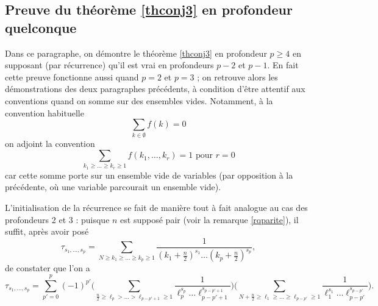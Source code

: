 \documentclass[12pt,francais, reqno]{smfart}
\numberwithin{equation}{section}
\begin{document}
 
\subsection{Preuve du th\'eor\`eme \ref{thconj3}  en profondeur quelconque}  \label{subsec54}


Dans ce paragraphe, on d\'emontre le th\'eor\`eme \ref{thconj3} en profondeur $p \geq 4$ en supposant (par r\'ecurrence) qu'il est vrai en profondeurs $p-2$ et $p-1$. En fait cette preuve fonctionne aussi quand $p=2$ et $p=3$ ; on retrouve alors les d\'emonstrations des deux paragraphes pr\'ec\'edents, \`a condition d'\^etre attentif aux conventions quand on somme sur des ensembles vides.
Notamment, \`a la convention habituelle
$$\sum_{k \in \emptyset } f(k) = 0$$
on adjoint la convention 
$$\sum_{k_1 \geq \ldots \geq k_r \geq 1} f(k_1, \ldots, k_r) = 1 \mbox{ pour } r = 0$$
car cette somme porte sur un ensemble vide de variables (par opposition \`a la pr\'ec\'edente, o\`u une variable parcourait un ensemble vide). 

\bigskip

L'initialisation de la r\'ecurrence se fait de mani\`ere tout \`a fait analogue au cas des profondeurs 2 et 3 : puisque $n$ est suppos\'e pair (voir la remarque \ref{rqparite}), il suffit, apr\`es avoir pos\'e 
$$\tau_{s_1,\ldots,s_p} = \sum_{N \geq k_1 \geq \ldots  \geq k_p \geq 1} \frac{1}{(k_1 + \frac{n}{2})^{s_1}  \ldots   (k_p + \frac{n}{2})^{s_p}   }, $$
de constater que l'on a 
$$
\tau_{s_1, \ldots,  s_p} 
= \sum_{p' = 0} ^p  (-1)^{p'} \Big( \sum_{\frac{n}{2} \geq \ell_p >  \ldots > \ell_{p-p'+1} \geq 1} \frac{1}{\ell_p ^{s_p}  \ldots  \ell_{p-p'+1} ^{s_{p-p'+1}}} \Big)
 \Big( \sum_{N+\frac{n}{2} \geq \ell_1 \geq  \ldots \geq \ell_{p-p'} \geq 1} \frac{1}{\ell_1 ^{s_1}  \ldots  \ell_{p-p'} ^{s_{p-p'}}} \Big). 
$$
\end{document}
